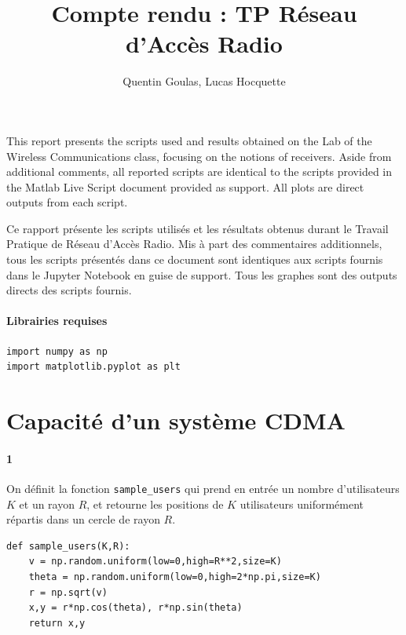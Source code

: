 \documentclass[a4paper,11pt,2]{article}
\title{Compte rendu : TP Réseau d'Accès Radio}
\author{Quentin Goulas, Lucas Hocquette}
\date{}
\begin{document}
\maketitle

This report presents the scripts used and results obtained on the Lab of the Wireless Communications class, focusing on the notions of receivers. Aside from additional comments, all reported scripts are identical to the scripts provided in the Matlab Live Script document provided as support. All plots are direct outputs from each script.

Ce rapport présente les scripts utilisés et les résultats obtenus durant le Travail Pratique de Réseau d'Accès Radio. Mis à part des commentaires additionnels, tous les scripts présentés dans ce document sont identiques aux scripts fournis dans le Jupyter Notebook en guise de support. Tous les graphes sont des outputs directs des scripts fournis.

\paragraph{Librairies requises}

\begin{center}
\begin{lstlisting}
import numpy as np
import matplotlib.pyplot as plt
\end{lstlisting}
\end{center}

\section{Capacité d'un système CDMA}
\paragraph{1} On définit la fonction \verb+sample_users+ qui prend en entrée un nombre d'utilisateurs $K$ et un rayon $R$, et retourne les positions de $K$ utilisateurs uniformément répartis dans un cercle de rayon $R$.

\begin{center}
\begin{lstlisting}
def sample_users(K,R):
    v = np.random.uniform(low=0,high=R**2,size=K)
    theta = np.random.uniform(low=0,high=2*np.pi,size=K)
    r = np.sqrt(v)
    x,y = r*np.cos(theta), r*np.sin(theta)
    return x,y
\end{lstlisting}
\end{center}
\end{document}
